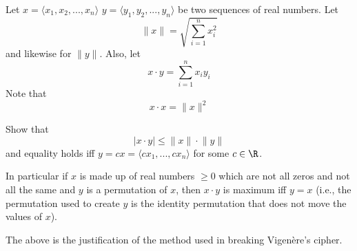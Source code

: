 Let
$x = \langle x_1, x_2, ..., x_n \rangle$
$y = \langle y_1, y_2, ..., y_n \rangle$
be two sequences of real numbers.
Let
\[
\lVert x \rVert = \sqrt{\sum_{i = 1}^n x_i^2}
\]
and likewise for $\lVert y \rVert$.
Also, let
\[
x \cdot y = \sum_{i = 1}^n x_i y_i
\]
Note that
\[
x \cdot x = \lVert x \rVert^2
\]
\begin{myenum}
\item Show that
\[
|x \cdot y| \leq  \lVert x \rVert \cdot \lVert y \rVert
\]
and equality holds iff $y = cx = \langle cx_1, ..., cx_n \rangle$ for some
$c \in \R$.
\item
In particular if $x$ is made up of real numbers $\geq 0$ which
are not all zeros and not all the same and $y$ is a permutation of $x$, then
$x \cdot y$ is maximum iff $y = x$
(i.e., the permutation used to create $y$ is the identity permutation
that does not move the values of $x$).
\end{myenum}
The above        is the justification of the method used in breaking
Vigen\`ere's cipher.
